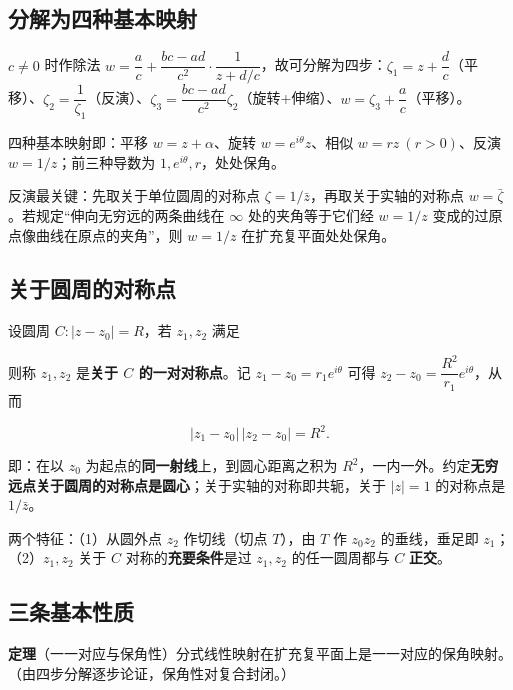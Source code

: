 \subsection{分解为四种基本映射}

\(c\neq0\) 时作除法 \(w=\dfrac{a}{c}+\dfrac{bc-ad}{c^{2}}\cdot\dfrac{1}{z+d/c}\)，故可分解为四步：\(\zeta_{1}=z+\dfrac{d}{c}\)（平移）、\(\zeta_{2}=\dfrac{1}{\zeta_{1}}\)（反演）、\(\zeta_{3}=\dfrac{bc-ad}{c^{2}}\zeta_{2}\)（旋转+伸缩）、\(w=\zeta_{3}+\dfrac{a}{c}\)（平移）。

四种基本映射即：平移 \(w=z+\alpha\)、旋转 \(w=e^{i\theta}z\)、相似 \(w=rz\ (r>0)\)、反演 \(w=1/z\)；前三种导数为 \(1,e^{i\theta},r\)，处处保角。

反演最关键：先取关于单位圆周的对称点 \(\zeta=1/\bar z\)，再取关于实轴的对称点 \(w=\bar\zeta\)。若规定“伸向无穷远的两条曲线在 \(\infty\) 处的夹角等于它们经 \(w=1/z\) 变成的过原点像曲线在原点的夹角”，则 \(w=1/z\) 在扩充复平面处处保角。

\subsection{关于圆周的对称点}

设圆周 \(C:|z-z_{0}|=R\)，若 \(z_{1},z_{2}\) 满足


则称 \(z_{1},z_{2}\) 是\textbf{关于 \(C\) 的一对对称点}。记 \(z_{1}-z_{0}=r_{1}e^{i\theta}\) 可得 \(z_{2}-z_{0}=\dfrac{R^{2}}{r_{1}}e^{i\theta}\)，从而

\[
|z_{1}-z_{0}|\,|z_{2}-z_{0}|=R^{2}.
\]

即：在以 \(z_{0}\) 为起点的\textbf{同一射线}上，到圆心距离之积为 \(R^{2}\)，一内一外。约定\textbf{无穷远点关于圆周的对称点是圆心}；关于实轴的对称即共轭，关于 \(|z|=1\) 的对称点是 \(1/\bar z\)。

两个特征：（1）从圆外点 \(z_{2}\) 作切线（切点 \(T\)），由 \(T\) 作 \(z_{0}z_{2}\) 的垂线，垂足即 \(z_{1}\)；（2）\(z_{1},z_{2}\) 关于 \(C\) 对称的\textbf{充要条件}是过 \(z_{1},z_{2}\) 的任一圆周都与 \(C\) \textbf{正交}。

\subsection{三条基本性质}

\textbf{定理}（一一对应与保角性）\quad 分式线性映射在扩充复平面上是一一对应的保角映射。（由四步分解逐步论证，保角性对复合封闭。）

